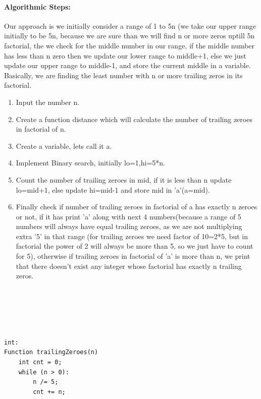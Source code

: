 \documentclass[10pt]{article}
\begin{document}
\begin{multicols*}{2}
\paragraph{Algorithmic Steps:}

Our approach is we initially consider a range of 1 to 5n (we take our upper range initially to be 5n, because we are sure than we will find n or more zeros uptill 5n factorial, the we check for the middle number in our range, if the middle number has less than n zero then we update our lower range to middle+1, else we just update our upper range to middle-1, and store the current middle in a variable. Basically, we are finding the least number with n or more trailing zeros in its factorial.
\begin{enumerate}

\item	Input the number n.
\item	Create a function distance which will calculate the number of trailing zeroes in factorial of n.
\item   Create a variable, lets call it a.
\item	Implement Binary search, initially lo=1,hi=5*n.
\item	Count the number of trailing zeroes in mid, if it is less than n update lo=mid+1, else update hi=mid-1 and store mid in 'a'(a=mid).
\item	Finally check if number of trailing zeroes in factorial of a has exactly n zeroes or not, if it has print 'a' along with next 4 numbers(because a range of 5 numbers will always have equal trailing zeroes, as we are not multiplying extra '5' in that range (for trailing zeroes we need factor of 10=2*5, but in factorial the power of 2 will always be more than 5, so we just have to count for 5), otherwise if trailing zeroes in factorial of 'a' is more than n, we print that there doesn't exist any integer whose factorial has exactly n trailing zeros.
\\\\\\\\\\
\end{enumerate}


\begin{lstlisting}

int:
Function trailingZeroes(n)
    int cnt = 0; 
    while (n > 0):
        n /= 5; 
        cnt += n; 
        

\end{lstlisting}
\end{multicols*}
\end{document}
